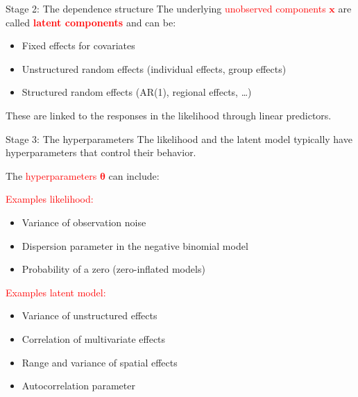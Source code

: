\documentclass[
  ignorenonframetext,
]{beamer}
\providecommand{\tightlist}{%
  \setlength{\itemsep}{0pt}\setlength{\parskip}{0pt}}
\begin{document}
\begin{frame}{Stage 2: The dependence structure}
\protect\hypertarget{stage-2-the-dependence-structure}{}
The underlying \textcolor{red}{unobserved components \(\boldsymbol{x}\)}
are called \textcolor{red}{\bf{latent} components} and can be:

\begin{itemize}
\tightlist
\item
  Fixed effects for covariates
\item
  Unstructured random effects (individual effects, group effects)
\item
  Structured random effects (AR(1), regional effects, \ldots)
\end{itemize}

These are linked to the responses in the likelihood through linear
predictors.
\end{frame}

\begin{frame}{Stage 3: The hyperparameters}
\protect\hypertarget{stage-3-the-hyperparameters}{}
The likelihood and the latent model typically have hyperparameters that
control their behavior.

The \textcolor{red}{hyperparameters \(\boldsymbol{\theta}\)} can
include:

\pause

\textcolor{red}{Examples likelihood:}

\begin{itemize}
\tightlist
\item
  Variance of observation noise
\item
  Dispersion parameter in the negative binomial model
\item
  Probability of a zero (zero-inflated models)
\end{itemize}

\pause

\textcolor{red}{Examples latent model:}

\begin{itemize}
\tightlist
\item
  Variance of unstructured effects
\item
  Correlation of multivariate effects
\item
  Range and variance of spatial effects
\item
  Autocorrelation parameter
\end{itemize}
\end{frame}
\end{document}
